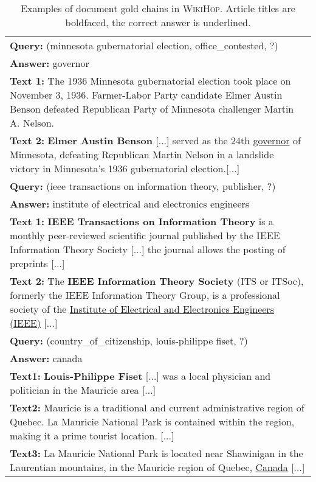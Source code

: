 \documentclass[11pt,letterpaper]{article}
\newcommand{\WikiHop}{\textsc{WikiHop}\xspace}
\begin{document}
\begin{table*}
\begin{tabular}{p{\textwidth}}
        \midrule
        \textbf{Query:} (minnesota gubernatorial election, office\_contested, ?) \\ 
        \textbf{Answer:} governor \\
        \textbf{Text 1:}
        The 1936 Minnesota gubernatorial election took place on November 3, 1936. Farmer-Labor Party candidate Elmer Austin Benson defeated Republican Party of Minnesota challenger Martin A. Nelson. \\
        \textbf{Text 2:}
        \textbf{Elmer Austin Benson} [...] served as the 24th \underline{governor} of Minnesota, defeating Republican Martin Nelson in a landslide victory in Minnesota's 1936 gubernatorial election.[...]\\
        \midrule
        \textbf{Query:} (ieee transactions on information theory, publisher, ?) \\ 
        \textbf{Answer:} institute of electrical and electronics engineers\\
        \textbf{Text 1:} \textbf{IEEE Transactions on Information Theory} is a monthly peer-reviewed scientific journal published by the IEEE Information Theory Society [...] the journal allows the posting of preprints [...]\\
        \textbf{Text 2:} 
        The \textbf{IEEE Information Theory Society} (ITS or ITSoc), formerly the IEEE Information Theory Group, is a professional society of the \underline{Institute of Electrical and Electronics Engineers (IEEE)} [...]\\
        \midrule
        \textbf{Query:} (country\_of\_citizenship, louis-philippe fiset, ?)\\
        \textbf{Answer:} canada\\
        \textbf{Text1:} \textbf{Louis-Philippe Fiset} [...] was a local physician and politician in the Mauricie area [...] \\
        \textbf{Text2:} Mauricie is a traditional and current administrative region of Quebec. La Mauricie National Park is contained within the region, making it a prime tourist location. [...] \\
        \textbf{Text3:} La Mauricie National Park is located near Shawinigan in the Laurentian mountains, in the Mauricie region of Quebec, \underline{Canada} [...]\\
        \bottomrule
    \end{tabular}
    \caption{Examples of document gold chains in \WikiHop. Article titles are boldfaced, the correct answer is underlined.
    }
    \label{tbl:gold-chain-examples}
\end{table*}
\end{document}
